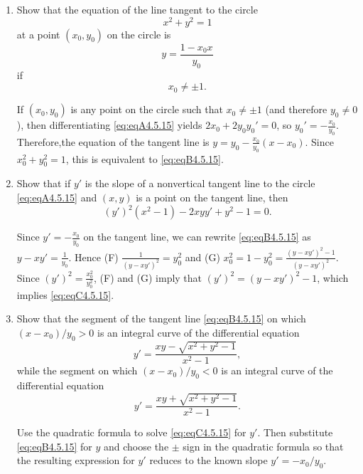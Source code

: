 \documentclass{ximera}
\begin{document}
\begin{problem}\label{exer:4.5.15}
\begin{enumerate}
\item %
Show that the equation of the line tangent to the circle
\begin{equation}\label{eq:eqA4.5.15}
x^2+y^2=1
\end{equation}
at a point $(x_0,y_0)$  on the circle is
\begin{equation}\label{eq:eqB4.5.15}
y=\frac{1-x_0x}{ y_0}
\end{equation}
if 
\begin{equation}
  x_0\ne\pm1.  
\end{equation}

\begin{solution}
If $(x_0,y_0)$ is any point on the circle such that
$x_0\ne\pm1$ (and therefore $y_0\ne0$), then differentiating \ref{eq:eqA4.5.15}
yields $2x_0+2y_0y_0'=0$, so $y_0'=-\frac{x_0}{y_0}$. Therefore,the
equation of the tangent line is $y=y_0-\frac{x_0}{y_0}(x-x_0)$.
Since $x_0^2+y_0^2=1$, this is equivalent to \ref{eq:eqB4.5.15}.
\end{solution}
 
\item %
Show that if $y'$ is the slope of a nonvertical tangent line to the
circle \ref{eq:eqA4.5.15} and $(x,y)$ is a point on the tangent line, then
\begin{equation}\label{eq:eqC4.5.15}
(y')^2(x^2-1)-2xyy'+y^2-1=0.
\end{equation}

\begin{solution}
Since $y'=-\frac{x_0}{y_0}$ on the tangent line, we can rewrite \ref{eq:eqB4.5.15}
as $y-xy'=\frac{1}{y_0}$. Hence (F) $\frac{1}{(y-xy')^2}=y_0^2$
and (G) $x_0^2=1-y_0^2=\frac{(y-xy')^2-1}{(y-xy')^2}$. Since
$(y')^2=\frac{x_0^2}{y_0^2}$, (F) and (G) imply that
$(y')^2=(y-xy')^2-1$, which implies \ref{eq:eqC4.5.15}.
\end{solution}

\item %
Show that the segment of the tangent line \ref{eq:eqB4.5.15} on which $(x-x_0)/y_0>0$
is an integral curve of the differential equation
\begin{equation}\label{eq:eqD4.5.15}
y'=\frac{xy-\sqrt{x^2+y^2-1}}{x^2-1},
\end{equation}
while the segment on which $(x-x_0)/y_0<0$ is an integral curve of the
differential equation
\begin{equation}\label{eq:eqE4.5.15}
y'=\frac{xy+\sqrt{x^2+y^2-1}}{x^2-1}.
\end{equation}
\begin{hint}
Use the quadratic formula to solve \ref{eq:eqC4.5.15} for
$y'$. Then substitute \ref{eq:eqB4.5.15} for $y$ and choose the $\pm$ sign in the quadratic formula so that the
resulting expression for $y'$ reduces to the known slope
$y'=-x_0/y_0$.
\end{hint}


\end{enumerate}
\end{problem}
\end{document}
